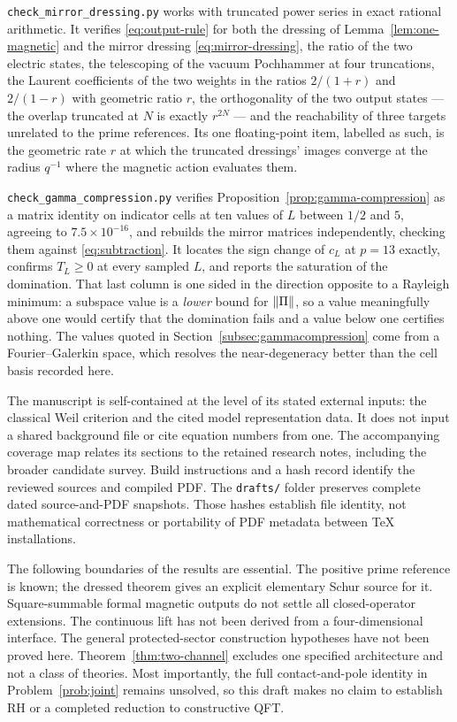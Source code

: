 \texttt{check\_mirror\_dressing.py} works with truncated power series in exact
rational arithmetic. It verifies \eqref{eq:output-rule} for both the dressing
of Lemma~\ref{lem:one-magnetic} and the mirror dressing
\eqref{eq:mirror-dressing}, the ratio of the two electric states, the
telescoping of the vacuum Pochhammer at four truncations, the Laurent
coefficients of the two weights in the ratios $2/(1+r)$ and $2/(1-r)$ with
geometric ratio $r$, the orthogonality of the two output states --- the overlap
truncated at $N$ is exactly $r^{2N}$ --- and the reachability of three targets
unrelated to the prime references. Its one floating-point item, labelled as
such, is the geometric rate $r$ at which the truncated dressings' images
converge at the radius $q^{-1}$ where the magnetic action evaluates them.

\texttt{check\_gamma\_compression.py} verifies
Proposition~\ref{prop:gamma-compression} as a matrix identity on indicator
cells at ten values of $L$ between $1/2$ and $5$, agreeing to
$7.5\times10^{-16}$, and rebuilds the mirror matrices independently, checking
them against \eqref{eq:subtraction}. It locates the sign change of $c_L$ at
$p=13$ exactly, confirms $T_L\geq0$ at every sampled $L$, and reports the
saturation of the domination. That last column is one sided in the direction
opposite to a Rayleigh minimum: a subspace value is a \emph{lower} bound for
$\lVert \Pi\rVert$, so a value meaningfully above one would certify that the domination
fails and a value below one certifies nothing. The values quoted in
Section~\ref{subsec:gammacompression} come from a Fourier--Galerkin space,
which resolves the near-degeneracy better than the cell basis recorded here.

The manuscript is self-contained at the level of its stated external
inputs: the classical Weil criterion and the cited model representation
data. It does not input a shared background file or cite equation numbers
from one. The accompanying coverage map relates its sections to the
retained research notes, including the broader candidate survey.
Build instructions and a hash record identify the reviewed sources and
compiled PDF. The \texttt{drafts/} folder preserves complete dated
source-and-PDF snapshots. Those hashes establish file identity, not
mathematical correctness or portability of PDF metadata between TeX
installations.

The following boundaries of the results are essential. The positive
prime reference is known; the dressed theorem gives an explicit
elementary Schur source for it. Square-summable formal magnetic
outputs do not settle all closed-operator extensions. The continuous
lift has not been derived from a four-dimensional interface. The
general protected-sector construction hypotheses have not been
proved here. Theorem~\ref{thm:two-channel} excludes one specified
architecture and not a class of theories. Most importantly, the full
contact-and-pole identity in Problem~\ref{prob:joint} remains unsolved, so
this draft makes no claim to establish RH or a completed reduction to
constructive QFT.
